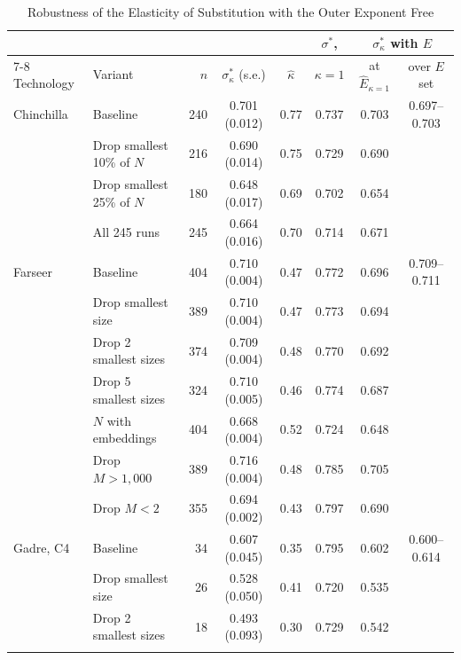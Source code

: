 \begin{table}[tp]
\centering
\caption{Robustness of the Elasticity of Substitution with the Outer Exponent Free}
\label{tab:app-kappa-robust}
\footnotesize
\setlength{\tabcolsep}{2.6pt}
\begin{tabular*}{\textwidth}{@{\extracolsep{\fill}}llrccccc@{}}
\toprule
 & & & & & $\sigma^*$, & \multicolumn{2}{c}{$\sigma^*_\kappa$ with $E$} \\
\cmidrule(l){7-8}
Technology & Variant & $n$ & $\sigma^*_\kappa$ (s.e.) & $\hat\kappa$ & $\kappa=1$ & at $\hat E_{\kappa=1}$ & over $E$ set \\
\midrule
Chinchilla & Baseline & 240 & 0.701 (0.012) & 0.77 & 0.737 & 0.703 & 0.697--0.703 \\
 & Drop smallest 10\% of $N$ & 216 & 0.690 (0.014) & 0.75 & 0.729 & 0.690 &  \\
 & Drop smallest 25\% of $N$ & 180 & 0.648 (0.017) & 0.69 & 0.702 & 0.654 &  \\
 & All 245 runs & 245 & 0.664 (0.016) & 0.70 & 0.714 & 0.671 &  \\
\addlinespace[1pt]
Farseer & Baseline & 404 & 0.710 (0.004) & 0.47 & 0.772 & 0.696 & 0.709--0.711 \\
 & Drop smallest size & 389 & 0.710 (0.004) & 0.47 & 0.773 & 0.694 &  \\
 & Drop 2 smallest sizes & 374 & 0.709 (0.004) & 0.48 & 0.770 & 0.692 &  \\
 & Drop 5 smallest sizes & 324 & 0.710 (0.005) & 0.46 & 0.774 & 0.687 &  \\
 & $N$ with embeddings & 404 & 0.668 (0.004) & 0.52 & 0.724 & 0.648 &  \\
 & Drop $M>1{,}000$ & 389 & 0.716 (0.004) & 0.48 & 0.785 & 0.705 &  \\
 & Drop $M<2$ & 355 & 0.694 (0.002) & 0.43 & 0.797 & 0.690 &  \\
\addlinespace[1pt]
Gadre, C4 & Baseline & 34 & 0.607 (0.045) & 0.35 & 0.795 & 0.602 & 0.600--0.614 \\
 & Drop smallest size & 26 & 0.528 (0.050) & 0.41 & 0.720 & 0.535 &  \\
 & Drop 2 smallest sizes & 18 & 0.493 (0.093) & 0.30 & 0.729 & 0.542 &  \\
\addlinespace[1pt]

\end{tabular*}
\end{table}

